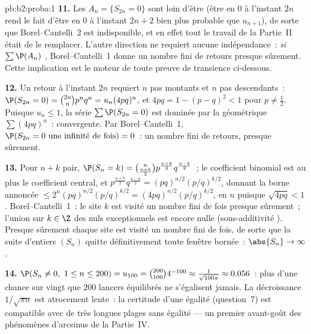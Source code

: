\begin{solution}{pb:b2:proba:1}
\textbf{11.} Les  $A_n = \{S_{2n} = 0\}$ sont loin d'être
 (être en $0$ à l'instant $2n$ rend le fait d'être en $0$ à
l'instant $2n + 2$ bien plus probable que $u_{n+1}$), de sorte que
Borel--Cantelli~2 est indisponible, et en effet tout le travail
de la Partie~II était de le remplacer. L'autre direction ne requiert aucune
indépendance~: \emph{si} $\sum\P(A_n)$ ,
Borel--Cantelli~1 donne un nombre fini de retours presque sûrement.
Cette implication est le moteur de toute preuve de transience
ci-dessous.

\textbf{12.} Un retour à l'instant $2n$ requiert $n$ pas montants et $n$
pas descendants~: $\P(S_{2n} = 0) = \binom{2n}np^nq^n =
u_n(4pq)^n$, et $4pq = 1 - (p - q)^2 < 1$ pour $p \neq
\frac12$. Puisque $u_n \leq 1$, la série $\sum\P(S_{2n} = 0)$
est dominée par la géométrique $\sum(4pq)^n$~: convergente. Par
Borel--Cantelli~1, $\P(S_{2n} = 0 \text{ une infinité de fois}) =
0$~: un nombre fini de retours, presque sûrement.

\textbf{13.} Pour $n + k$ pair, $\P(S_n = k) =
\binom{n}{\frac{n+k}2}p^{\frac{n+k}2}q^{\frac{n-k}2}$~; le
coefficient binomial est au plus le coefficient central, et
$p^{\frac{n+k}2}q^{\frac{n-k}2} = (pq)^{n/2}(p/q)^{k/2}$,
donnant la borne annoncée $\leq
2^n(pq)^{n/2}(p/q)^{k/2} = (4pq)^{n/2}(p/q)^{k/2}$, 
en $n$ puisque $\sqrt{4pq} < 1$. Borel--Cantelli~1~: le site $k$ est
visité un nombre fini de fois presque sûrement~; l'union sur $k \in
\Z$ des  nuls exceptionnels est encore nulle (sous-additivité
). Presque sûrement chaque site est visité un nombre fini de fois,
de sorte que la suite d'entiers $(S_n)$ quitte définitivement toute fenêtre
bornée~: $\abs{S_n} \to \infty$.

\textbf{14.} $\P(S_n \neq 0,\ 1 \leq n \leq 200) = u_{100} =
\binom{200}{100}4^{-100} \approx \frac1{\sqrt{100\pi}}
\approx 0.056$~: plus d'une chance sur vingt que $200$
lancers équilibrés ne s'égalisent jamais. La décroissance $1/\sqrt{\pi n}$ est
atrocement lente~: la certitude d'une égalité (question~7) est
compatible avec de très longues plages sans égalité --- un premier
avant-goût des phénomènes d'arcsinus de la Partie~IV.


\end{solution}
